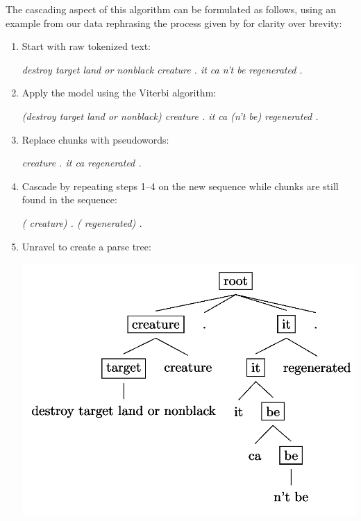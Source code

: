\documentclass[11pt,a4paper]{article}
\begin{document}
The cascading aspect of this algorithm can be formulated as follows, using an example from our data rephrasing the process given by \citet{ponvert-etal-2011-simple} for clarity over brevity:

\begin{enumerate}
	\item Start with raw tokenized text:
		
	\begin{center}\emph{destroy target land or nonblack creature . it ca n't be regenerated .}\end{center}	
	
	\item Apply the model using the Viterbi algorithm:	
	
	\begin{center}\emph{(destroy target land or nonblack) creature . it ca (n't be) regenerated .}\end{center}	
	
	\item Replace chunks with pseudowords:	
	
	\begin{center}\emph{ creature . it ca  regenerated .}\end{center}	
	
	\item Cascade by repeating steps 1--4 on the new sequence while chunks are still found in the sequence:
	
	\begin{center}\emph{( creature) . ( regenerated) .}\end{center}
	
	\item Unravel to create a parse tree:	
	
	\includegraphics[width=\linewidth]{parse_tree_example.png}
\end{enumerate}
\end{document}
